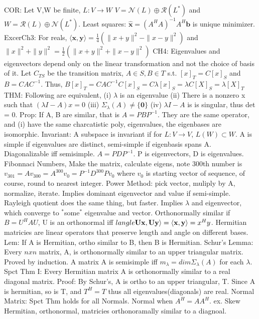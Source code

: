 \documentclass[8pt]{extarticle}
\theoremstyle{definition}
\begin{document}
{COR: Let V,W be finite, $L:V \rightarrow W$ $V = \mathscr{N}(L) \oplus \mathscr{R}(L^*)$ and $W = \mathscr{R}(L) \oplus \mathscr{N}(L^*)$.
Least squares: $\hat{ \mathbf{x}} = (A^HA)^{-1}A^H \mathbf{b}$ is unique minimizer.
ExcerCh3: For reals, $\langle \mathbf{x}, \mathbf{y} \rangle = \frac{1}{4}(\|x+y\|^2 - \|x-y\|^2)$ and $\|x\|^2 +\|y\|^2 = \frac{1}{2}(\|x+y\|^2 + \|x-y\|^2)$
CH4: Eigenvalues and eigenvectors depend only on the linear transformation and not the choice of basis of it. Let $C_{TS}$ be the transition matrix, $A \in S, B \in T$ s.t. $[x]_T = C[x]_S$ and $B = CAC^{-1}$. Thus, 
$B[x]_T = C A C^{-1} C[x]_S = C\lambda[x]_S = \lambda C[X]_S = \lambda[X]_T$
THM: Following are equivalent, (i) $\lambda$ is an eigenvalue (ii) There is a nonzero x such that $(\lambda I -A)x = 0$ (iii) $\Sigma_\lambda(A) \neq \{\mathbf{0}\}$ (iv) $\lambda I -A$ is is singular, thus det = 0.
Prop: If A, B are similar, that is $A = PBP^{-1}$. They are the same operator, and 
(i) have the same charcatistic poly, eigenvalues, the eigenbases are isomorphic.
Invariant: A subspace is invariant if for $L:V \rightarrow V$, $L(W) \subset W$. 
A is simple if eigenvalues are distinct, semi-simple if eigenbasis spans A. Diagonalizable iff semisimple. $A=PDP^{-1}$. P is eigenvectors, D is eigenvalues. 
Fibonnaci Numbers, Make the matrix, calculate eigens, note 300th number is
$v_{301} = Av_{300} = A^{300}v_0 = P^{-1}D^{300}Pv_0$ where $v_0$ is starting vector of sequence, of course, round to nearest integer.
Power Method: pick vector, muliply by A, normalize, iterate. Implies dominant eigenvector and value if semi-simple.
Rayleigh quotient does the same thing, but faster. Implies $\lambda$ and eigenvector, which converge to $^*$some$^*$ eigenvalue and vector.
Orthonormally similar if $B=U^HAU$, U is an orthonormal iff $\\langle \mathbf{Ux}, \mathbf{Uy} \rangle = \langle \mathbf{x}, \mathbf{y} \rangle = x^Hy$.
Hermitian matricies are linear operators that preserve length and angle on different bases.
Lem: If A is Hermitian, ortho similar to B, then B is Hermitian.
Schur's Lemma: Every $nxn$ matrix, A, is orthonormally similar to an upper triangular matrix. Proved by induction.
A matrix A is semisimple iff $m_\lambda = dim\Sigma_\lambda(A)$ for each $\lambda$.
Spct Thm I: Every Hermitian matrix A is orthonormally similar to a real diagonal matrix. 
Proof: By Schur's, A is ortho to an upper triangular, T. Since A is hermitian, so is T, and $T^H = T$ thus all eigenvalues(diagonals) are real.
Normal Matrix: Spct Thm holds for all Normals. Normal when $A^H = AA^H$. ex. Skew Hermitian, orthonormal, matricies orthonoramally similar to a diagnoal.
}
\end{document}
